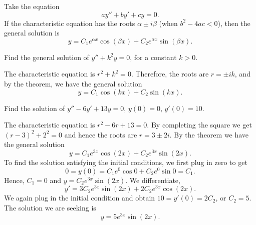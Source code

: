 \documentclass{ximera}
\begin{document}
\begin{theorem}{}
    Take the equation
    \begin{equation*}
        ay'' + by' + cy = 0 .
    \end{equation*}
    If the characteristic equation has the roots $\alpha \pm i \beta$ (when $b^2 - 4ac < 0$), then the general solution is
    \begin{equation*}
        y = C_1 e^{\alpha x} \cos (\beta x) + C_2 e^{\alpha x} \sin (\beta x) .
    \end{equation*}
\end{theorem}

\begin{example} \label{example:sincossecondorder}
    Find the general solution of $y'' + k^2 y = 0$, for a constant $k > 0$.
\end{example}

\begin{exampleSol}
    The characteristic equation is $r^2 + k^2 = 0$.  Therefore, the roots are $r = \pm ik$, and by the theorem, we have the general solution
    \begin{equation*}
        y = C_1 \cos (kx) + C_2 \sin (kx) .
    \end{equation*}
\end{exampleSol}

\begin{example}
    Find the solution of $y'' - 6 y' + 13 y = 0$, $y(0) = 0$, $y'(0) = 10$.
\end{example}

\begin{exampleSol}
    The characteristic equation is $r^2 - 6 r + 13 = 0$.  By completing the square we get ${(r-3)}^2 + 2^2 = 0$ and hence the roots are $r = 3 \pm 2i$. By the theorem we have the general solution
    \begin{equation*}
        y = C_1 e^{3x} \cos (2x) + C_2 e^{3x} \sin (2x) .
    \end{equation*}
    To find the solution satisfying the initial conditions, we first plug in zero to get
    \begin{equation*}
        0 = y(0) = C_1 e^{0} \cos 0 + C_2 e^{0} \sin 0  = C_1 .
    \end{equation*}
    Hence, $C_1 = 0$ and $y = C_2 e^{3x} \sin (2x)$.  We differentiate,
    \begin{equation*}
        y' = 3C_2 e^{3x} \sin (2x) + 2C_2 e^{3x} \cos (2x) .
    \end{equation*}
    We again plug in the initial condition and obtain $10 = y'(0) = 2C_2$, or $C_2 = 5$.  The solution we are seeking is
    \begin{equation*}
        y = 5 e^{3x} \sin (2x) .
    \end{equation*}
\end{exampleSol}
\end{document}
